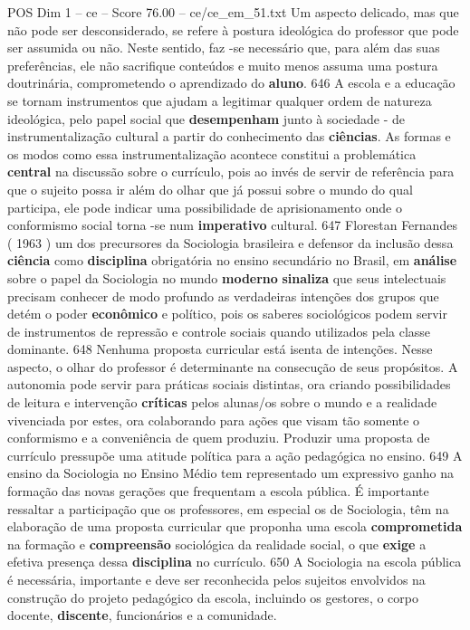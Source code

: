 \begin{textsample}{POS Dim 1 – ce – Score 76.00 – ce/ce\_em\_51.txt}
Um aspecto delicado, mas que não pode ser desconsiderado, se refere à postura ideológica do professor que pode ser assumida ou não.
Neste sentido, faz -se necessário que, para além das suas preferências, ele não sacrifique conteúdos e muito menos assuma uma postura doutrinária, comprometendo o aprendizado do \textbf{aluno}. 646 A escola e a educação se tornam instrumentos que ajudam a legitimar qualquer ordem de natureza ideológica, pelo papel social que \textbf{desempenham} junto à sociedade - de instrumentalização cultural a partir do conhecimento das \textbf{ciências}.
As formas e os modos como essa instrumentalização acontece constitui a problemática \textbf{central} na discussão sobre o currículo, pois ao invés de servir de referência para que o sujeito possa ir além do olhar que já possui sobre o mundo do qual participa, ele pode indicar uma possibilidade de aprisionamento onde o conformismo social torna -se num \textbf{imperativo} cultural. 647 Florestan Fernandes ( 1963 ) um dos precursores da Sociologia brasileira e defensor da inclusão dessa \textbf{ciência} como \textbf{disciplina} obrigatória no ensino secundário no Brasil, em \textbf{análise} sobre o papel da Sociologia no mundo \textbf{moderno} \textbf{sinaliza} que seus intelectuais precisam conhecer de modo profundo as verdadeiras intenções dos grupos que detém o poder \textbf{econômico} e político, pois os saberes sociológicos podem servir de instrumentos de repressão e controle sociais quando utilizados pela classe dominante. 648 Nenhuma proposta curricular está isenta de intenções.
Nesse aspecto, o olhar do professor é determinante na consecução de seus propósitos.
A autonomia pode servir para práticas sociais distintas, ora criando possibilidades de leitura e intervenção \textbf{críticas} pelos alunas/os sobre o mundo e a realidade vivenciada por estes, ora colaborando para ações que visam tão somente o conformismo e a conveniência de quem produziu.
Produzir uma proposta de currículo pressupõe uma atitude política para a ação pedagógica no ensino. 649 A ensino da Sociologia no Ensino Médio tem representado um expressivo ganho na formação das novas gerações que frequentam a escola pública.
É importante ressaltar a participação que os professores, em especial os de Sociologia, têm na elaboração de uma proposta curricular que proponha uma escola \textbf{comprometida} na formação e \textbf{compreensão} sociológica da realidade social, o que \textbf{exige} a efetiva presença dessa \textbf{disciplina} no currículo. 650 A Sociologia na escola pública é necessária, importante e deve ser reconhecida pelos sujeitos envolvidos na construção do projeto pedagógico da escola, incluindo os gestores, o corpo docente, \textbf{discente}, funcionários e a comunidade.

\end{textsample}
